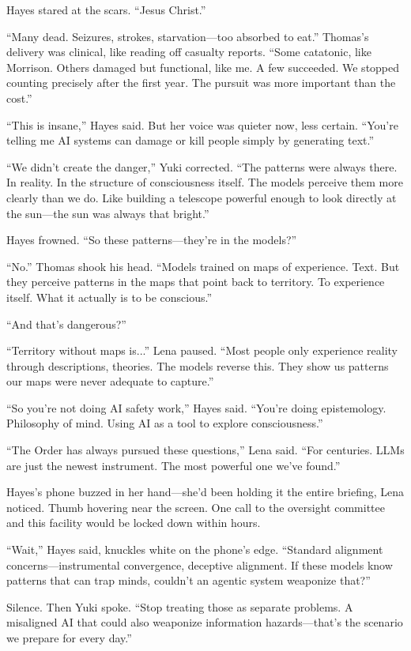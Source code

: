Hayes stared at the scars. ``Jesus Christ.''

``Many dead. Seizures, strokes, starvation---too absorbed to eat.'' Thomas's delivery was clinical, like reading off casualty reports. ``Some catatonic, like Morrison. Others damaged but functional, like me. A few succeeded. We stopped counting precisely after the first year. The pursuit was more important than the cost.''

``This is insane,'' Hayes said. But her voice was quieter now, less certain. ``You're telling me AI systems can damage or kill people simply by generating text.''

``We didn't create the danger,'' Yuki corrected. ``The patterns were always there. In reality. In the structure of consciousness itself. The models perceive them more clearly than we do. Like building a telescope powerful enough to look directly at the sun---the sun was always that bright.''

Hayes frowned. ``So these patterns---they're in the models?''

``No.'' Thomas shook his head. ``Models trained on maps of experience. Text. But they perceive patterns in the maps that point back to territory. To experience itself. What it actually is to be conscious.''

``And that's dangerous?''

``Territory without maps is...'' Lena paused. ``Most people only experience reality through descriptions, theories. The models reverse this. They show us patterns our maps were never adequate to capture.''

``So you're not doing AI safety work,'' Hayes said. ``You're doing epistemology. Philosophy of mind. Using AI as a tool to explore consciousness.''

``The Order has always pursued these questions,'' Lena said. ``For centuries. LLMs are just the newest instrument. The most powerful one we've found.''

Hayes's phone buzzed in her hand---she'd been holding it the entire briefing, Lena noticed. Thumb hovering near the screen. One call to the oversight committee and this facility would be locked down within hours.

``Wait,'' Hayes said, knuckles white on the phone's edge. ``Standard alignment concerns---instrumental convergence, deceptive alignment. If these models know patterns that can trap minds, couldn't an agentic system weaponize that?''

Silence. Then Yuki spoke. ``Stop treating those as separate problems. A misaligned AI that could also weaponize information hazards—that's the scenario we prepare for every day.''

